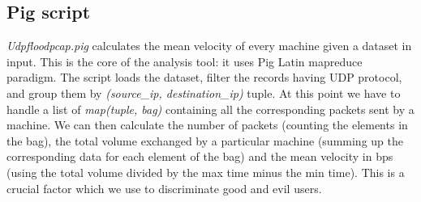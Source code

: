 \subsection{Pig script}
\textit{Udpfloodpcap.pig} calculates the mean velocity of every machine given a dataset in input. This is the core of the analysis tool: it uses Pig Latin mapreduce paradigm. The script loads the dataset, filter the records having UDP protocol, and group them by \textit{(source\_ip, destination\_ip)} tuple. At this point we have to handle a list of \textit{map(tuple, bag)} containing all the corresponding packets sent by a machine. We can then calculate the number of packets (counting the elements in the bag), the total volume exchanged by a particular machine (summing up the corresponding data for each element of the bag) and the mean velocity in bps (using the total volume divided by the max time minus the min time). This is a crucial factor which we use to discriminate good and evil users.
